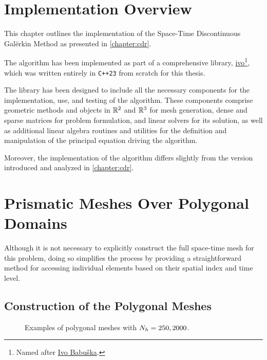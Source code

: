 \section{Implementation Overview}

This chapter outlines the implementation of the Space-Time Discontinuous Galërkin Method as presented in \cref{chapter:cdr}.

The algorithm has been implemented as part of a comprehensive library, \href{https://github.com/diantonioandrea/ivo}{ivo}\footnote{Named after \href{https://en.wikipedia.org/wiki/Ivo_Babuška}{Ivo Babuška}.}, which was written entirely in \lstinline{C++23} from scratch for this thesis.

The library has been designed to include all the necessary components for the implementation, use, and testing of the algorithm. These components comprise geometric methods and objects in $\mathbb{R}^{2}$ and $\mathbb{R}^{3}$ for mesh generation, dense and sparse matrices for problem formulation, and linear solvers for its solution, as well as additional linear algebra routines and utilities for the definition and manipulation of the principal equation driving the algorithm.

Moreover, the implementation of the algorithm differs slightly from the version introduced and analyzed in \cref{chapter:cdr}.

\newpage
\section{Prismatic Meshes Over Polygonal Domains}

Although it is not necessary to explicitly construct the full space-time mesh for this problem, doing so simplifies the process by providing a straightforward method for accessing individual elements based on their spatial index and time level. 

\subsection{Construction of the Polygonal Meshes}

\begin{figure}[!ht]
    \begin{subfigure}[b]{0.49\textwidth}
		\centering
        
    \end{subfigure}
	\hfill
    \begin{subfigure}[b]{0.49\textwidth}
		\centering
        
    \end{subfigure}
    \caption{Examples of polygonal meshes with $N_h = 250, 2000$.}
\end{figure}

